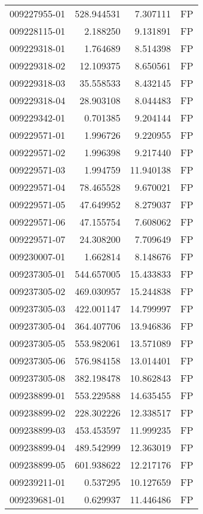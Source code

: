 \begin{tabular}{lrrl}
009227955-01 &  528.944531 &     7.307111 &   FP \\
009228115-01 &    2.188250 &     9.131891 &   FP \\
009229318-01 &    1.764689 &     8.514398 &   FP \\
009229318-02 &   12.109375 &     8.650561 &   FP \\
009229318-03 &   35.558533 &     8.432145 &   FP \\
009229318-04 &   28.903108 &     8.044483 &   FP \\
009229342-01 &    0.701385 &     9.204144 &   FP \\
009229571-01 &    1.996726 &     9.220955 &   FP \\
009229571-02 &    1.996398 &     9.217440 &   FP \\
009229571-03 &    1.994759 &    11.940138 &   FP \\
009229571-04 &   78.465528 &     9.670021 &   FP \\
009229571-05 &   47.649952 &     8.279037 &   FP \\
009229571-06 &   47.155754 &     7.608062 &   FP \\
009229571-07 &   24.308200 &     7.709649 &   FP \\
009230007-01 &    1.662814 &     8.148676 &   FP \\
009237305-01 &  544.657005 &    15.433833 &   FP \\
009237305-02 &  469.030957 &    15.244838 &   FP \\
009237305-03 &  422.001147 &    14.799997 &   FP \\
009237305-04 &  364.407706 &    13.946836 &   FP \\
009237305-05 &  553.982061 &    13.571089 &   FP \\
009237305-06 &  576.984158 &    13.014401 &   FP \\
009237305-08 &  382.198478 &    10.862843 &   FP \\
009238899-01 &  553.229588 &    14.635455 &   FP \\
009238899-02 &  228.302226 &    12.338517 &   FP \\
009238899-03 &  453.453597 &    11.999235 &   FP \\
009238899-04 &  489.542999 &    12.363019 &   FP \\
009238899-05 &  601.938622 &    12.217176 &   FP \\
009239211-01 &    0.537295 &    10.127659 &   FP \\
009239681-01 &    0.629937 &    11.446486 &   FP \\

\end{tabular}
